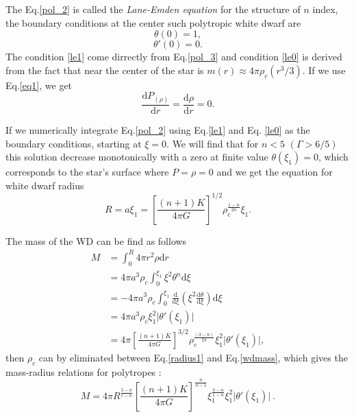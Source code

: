 \documentclass[oneside,a4paper,11pt]{report}
\begin{document}
The Eq.\eqref{pol_2} is called the \textit{Lane-Emden equation} for the structure of $n$ index, the boundary 
conditions at the center such polytropic white dwarf are
\begin{equation}
\label{le1}
 \theta(0) = 1, 
\end{equation}
\begin{equation}
\label{le0}
 \theta'(0)= 0.
\end{equation}
The condition \eqref{le1} come dirrectly from Eq.\eqref{pol_3} and condition \eqref{le0} is derived from the fact 
that near the center of the star is $m(r) \approx 4\pi \rho_c (r^3/3)$. If we use Eq.\eqref{eq1}, we get
\begin{equation}
 \frac{\mathrm{d}P_{(\rho)}}{\mathrm{d}r} = \frac{\mathrm{d}\rho}{\mathrm{d}r} = 0 .
\end{equation}

If we numerically integrate Eq.\eqref{pol_2} using Eq.\eqref{le1} and Eq. \eqref{le0} as the boundary conditions, 
starting at $\xi=0$. We will find that for $n<5$ $(\Gamma>6/5)$ this solution decrease monotonically with a zero 
at finite value $\theta(\xi_1) = 0$, which corresponds to the star's surface where $P=\rho = 0$ and we get the 
equation for white dwarf radius 
\begin{equation}
 \label{radius1}
R = a\xi_1 = \left[ \frac{(n+1)K}{4\pi G} \right]^{1/2}\rho_c^{\frac{1-n}{2n}}\xi_1.
\end{equation}

The mass of the WD can be find as follows
\begin{equation}
 \label{wdmass}
\begin{split}
M &= \int_{0}^{R} 4\pi r^2 \rho \mathrm{d}r \\
  &= 4 \pi a^3 \rho_c \int_{0}^{\xi_1} \xi^2 \theta^n \mathrm{d}\xi \\
  &= -4 \pi a^3 \rho_c \int_{0}^{\xi_1}\frac{\mathrm{d}}{\mathrm{d}\xi}\left( \xi^2 \frac{\mathrm{d}\theta}{\mathrm{d}\xi}\right)\mathrm{d}\xi \\
  &= 4 \pi a^3 \rho_c \xi_1^2 \lvert \theta' (\xi_1) \lvert \\
  & = 4 \pi \left[ \frac{(n+1)K}{4 \pi G}\right]^{3/2} \rho_c^{\frac{(3-n)}{2\pi}}\xi_1^2 \lvert \theta' (\xi_1)\lvert ,
\end{split}
\end{equation}
then $\rho_c$ can by eliminated between Eq.\eqref{radius1} and Eq.\eqref{wdmass}, which gives the mass-radius relations 
for polytropes \citet{2004bhwd.book.....S}:  
\begin{equation}
\label{mr_eq}
 M = 4 \pi R^{\frac{3-n}{t-n}}\left[ \frac{(n+1)K}{4 \pi G}\right]^{\frac{n}{n-1}}
\xi_1^{\frac{3-n}{1-n}}\xi_1^2\lvert\theta' (\xi_1) \lvert \: .
\end{equation}
\end{document}
